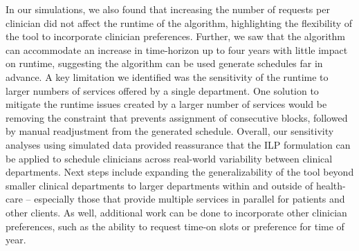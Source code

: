 In our simulations, we also found that increasing the number of requests per
clinician did not affect the runtime of the algorithm, highlighting the
flexibility of the tool to incorporate clinician preferences. Further, we saw
that the algorithm can accommodate an increase in time-horizon up to four years
with little impact on runtime, suggesting the algorithm can be used generate
schedules far in advance. A key limitation we identified was the sensitivity
of the runtime to larger numbers of services offered by a single department. 
One solution to mitigate the runtime issues created by a
larger number of services would be removing the constraint that prevents
assignment of consecutive blocks, followed by manual readjustment from the
generated schedule.
Overall, our sensitivity analyses using simulated data provided reassurance that
the ILP formulation can be applied to schedule clinicians across real-world
variability between clinical departments.
Next steps include expanding the generalizability of the tool beyond smaller
clinical departments to larger departments within and outside of health-care --
especially those that provide multiple services in parallel for patients and
other clients. As well, additional work can be done to incorporate other
clinician preferences, such as the ability to request time-on slots or preference
for time of year.